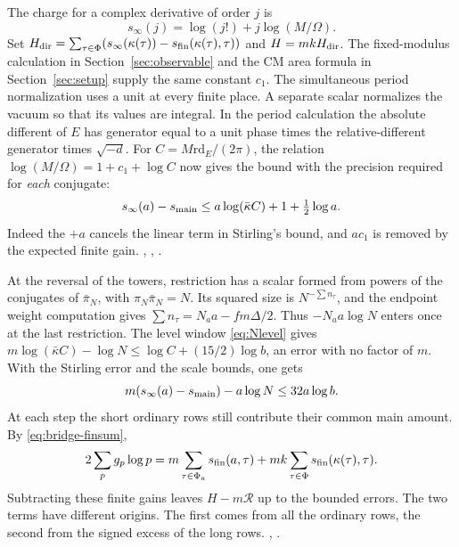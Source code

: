 The charge for a complex derivative of order \(j\) is
\[
        s_\infty(j)=\log(j!)+j\log(M/\Omega).
\]
Set \(H_{\rm dir}=\sum_{\tau\in\Phi}(s_\infty(\kappa(\tau))-s_{\rm fin}(\kappa(\tau),\tau))\) and \(H=mkH_{\rm dir}\). The fixed-modulus calculation in Section~\ref{sec:observable} and the CM area formula in Section~\ref{sec:setup} supply the same constant \(c_1\). The simultaneous period normalization uses a unit at every finite place. A separate scalar normalizes the vacuum so that its values are integral. In the period calculation the absolute different of \(E\) has generator equal to a unit phase times the relative-different generator times \(\sqrt{-d}\). For \(C=M\mathrm{rd}_E/(2\pi)\), the relation \(\log(M/\Omega)=1+c_1+\log C\) now gives the bound with the precision required for \emph{each} conjugate:
\[
       s_\infty(a)-s_{\rm main}\le
                  a\log(\bar\kappa C)+1+\tfrac12\log a .
\]
Indeed the \(+a\) cancels the linear term in Stirling's bound, and \(ac_1\) is removed by the expected finite gain. , , .

At the reversal of the towers, restriction has a scalar formed from powers of the conjugates of \(\bar\pi_N\), with \(\pi_N\bar\pi_N=N\). Its squared size is \(N^{-\sum n_\tau}\), and the endpoint weight computation gives \(\sum n_\tau=N_a a-fm\Delta/2\). Thus \(-N_a a\log N\) enters once at the last restriction. The level window \eqref{eq:Nlevel} gives \(m\log(\bar\kappa C)-\log N\le\log C+(15/2)\log b\), an error with no factor of \(m\). With the Stirling error and the scale bounds, one gets
\[
          m(s_\infty(a)-s_{\rm main})-a\log N\le32a\log b.
\]
At each step the short ordinary rows still contribute their common main amount. By \eqref{eq:bridge-finsum},
\[
     2\sum_p g_p\log p =
      m\sum_{\tau\in\Phi_a}s_{\rm fin}(a,\tau)
      +mk\sum_{\tau\in\Phi}s_{\rm fin}(\kappa(\tau),\tau).
\]
Subtracting these finite gains leaves \(H-m\mathcal R\) up to the bounded errors. The two terms have different origins. The first comes from all the ordinary rows, the second from the signed excess of the long rows. , .

